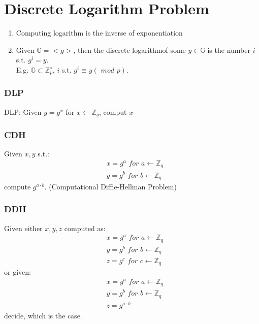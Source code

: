 \documentclass{report}
\begin{document}
\section{Discrete Logarithm Problem}
\begin{adjustwidth}{2em}{2em}
	\begin{enumerate}[-]
		\item Computing logarithm is the inverse of exponentiation
		\item Given $\mathbb{G} = <g>$, then the discrete logarithmof some $y \in \mathbb{G}$ is the number $i$ s.t. $g^i = y$. \\
		E.g. $\mathbb{G} \subset \mathbb{Z}_p^{\star}$, $i$ s.t. $g^i \equiv y (\textit{ mod } p)$.
	\end{enumerate}
	\subsubsection{DLP}
	\begin{adjustwidth}{2em}{}
		DLP: Given $y = g^x$ for $x \leftarrow \mathbb{Z}_q$, comput $x$
	\end{adjustwidth}
	\subsubsection{CDH}
	\begin{adjustwidth}{2em}{}
		Given $x, y$ s.t.:
		\begin{align*}
			& x = g^a \textit{ for } a \leftarrow \mathbb{Z}_q \\
			& y = g^b \textit{ for } b \leftarrow \mathbb{Z}_q
		\end{align*}
		compute $g^{a \cdot b}$. (Computational Diffie-Hellman Problem)
	\end{adjustwidth}
	\subsubsection{DDH}
	\begin{adjustwidth}{2em}{}
		Given either $x,y,z$ computed as:
		\begin{align*}
			& x = g^a \textit{ for } a \leftarrow \mathbb{Z}_q \\
			& y = g^b \textit{ for } b \leftarrow \mathbb{Z}_q \\
			& z = g^c \textit{ for } c \leftarrow \mathbb{Z}_q
		\end{align*}
		or given:
		\begin{align*}
			& x = g^a \textit{ for } a \leftarrow \mathbb{Z}_q \\
			& y = g^b \textit{ for } b \leftarrow \mathbb{Z}_q \\
			& z = g^{a \cdot b}
		\end{align*}
		decide, which is the case.
	\end{adjustwidth}
\end{adjustwidth}
\end{document}
